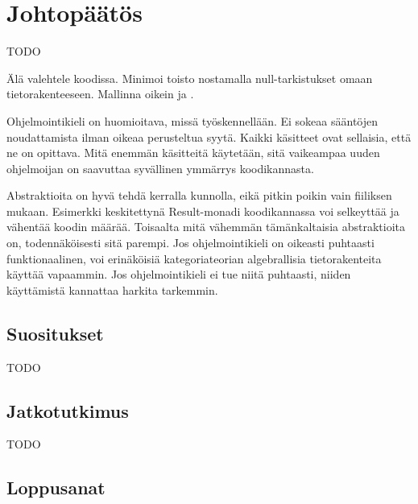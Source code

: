 \vspace{21.5pt}
\chapter{Johtopäätös}
TODO

Älä valehtele koodissa. Minimoi toisto nostamalla null-tarkistukset omaan tietorakenteeseen.
Mallinna oikein ja .

Ohjelmointikieli on huomioitava, missä työskennellään. Ei sokeaa sääntöjen noudattamista ilman oikeaa perusteltua syytä. Kaikki käsitteet ovat sellaisia, että ne on opittava. Mitä enemmän käsitteitä käytetään, sitä vaikeampaa uuden ohjelmoijan on saavuttaa syvällinen ymmärrys koodikannasta.

Abstraktioita on hyvä tehdä kerralla kunnolla, eikä pitkin poikin vain fiiliksen mukaan. Esimerkki keskitettynä Result-monadi koodikannassa voi selkeyttää ja vähentää koodin määrää. Toisaalta mitä vähemmän tämänkaltaisia abstraktioita on, todennäköisesti sitä parempi. Jos ohjelmointikieli on oikeasti puhtaasti funktionaalinen, voi erinäköisiä kategoriateorian algebrallisia tietorakenteita käyttää vapaammin. Jos ohjelmointikieli ei tue niitä puhtaasti, niiden käyttämistä kannattaa harkita tarkemmin.

\section{Suositukset}

TODO


\section{Jatkotutkimus}

TODO

\section{Loppusanat}


